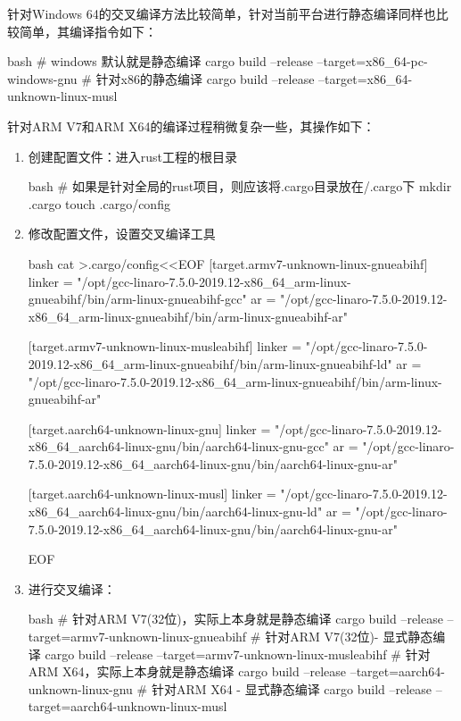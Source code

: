 针对Windows 64的交叉编译方法比较简单，针对当前平台进行静态编译同样也比较简单，其编译指令如下：
\begin{code-block}{bash}
# windows 默认就是静态编译
cargo build --release --target=x86_64-pc-windows-gnu
# 针对x86的静态编译
cargo build --release --target=x86_64-unknown-linux-musl
\end{code-block}

针对ARM V7和ARM X64的编译过程稍微复杂一些，其操作如下：
\begin{enumerate}
  \item 创建配置文件：进入rust工程的根目录
\begin{code-block}{bash}
# 如果是针对全局的rust项目，则应该将.cargo目录放在/.cargo下
mkdir .cargo
touch .cargo/config
\end{code-block}

  \item 修改配置文件，设置交叉编译工具
\begin{code-block}{bash}
cat >.cargo/config<<EOF
[target.armv7-unknown-linux-gnueabihf]
linker = "/opt/gcc-linaro-7.5.0-2019.12-x86_64_arm-linux-gnueabihf/bin/arm-linux-gnueabihf-gcc"
ar = "/opt/gcc-linaro-7.5.0-2019.12-x86_64_arm-linux-gnueabihf/bin/arm-linux-gnueabihf-ar"

[target.armv7-unknown-linux-musleabihf]
linker = "/opt/gcc-linaro-7.5.0-2019.12-x86_64_arm-linux-gnueabihf/bin/arm-linux-gnueabihf-ld"
ar = "/opt/gcc-linaro-7.5.0-2019.12-x86_64_arm-linux-gnueabihf/bin/arm-linux-gnueabihf-ar"

[target.aarch64-unknown-linux-gnu]
linker = "/opt/gcc-linaro-7.5.0-2019.12-x86_64_aarch64-linux-gnu/bin/aarch64-linux-gnu-gcc"
ar = "/opt/gcc-linaro-7.5.0-2019.12-x86_64_aarch64-linux-gnu/bin/aarch64-linux-gnu-ar"

[target.aarch64-unknown-linux-musl]
linker = "/opt/gcc-linaro-7.5.0-2019.12-x86_64_aarch64-linux-gnu/bin/aarch64-linux-gnu-ld"
ar = "/opt/gcc-linaro-7.5.0-2019.12-x86_64_aarch64-linux-gnu/bin/aarch64-linux-gnu-ar"

EOF
\end{code-block}

  \item 进行交叉编译：
\begin{code-block}{bash}
# 针对ARM V7(32位)，实际上本身就是静态编译
cargo build --release --target=armv7-unknown-linux-gnueabihf
# 针对ARM V7(32位)- 显式静态编译
cargo build --release --target=armv7-unknown-linux-musleabihf
# 针对ARM X64，实际上本身就是静态编译
cargo build --release --target=aarch64-unknown-linux-gnu
# 针对ARM X64 - 显式静态编译
cargo build --release --target=aarch64-unknown-linux-musl
\end{code-block}

\end{enumerate}

